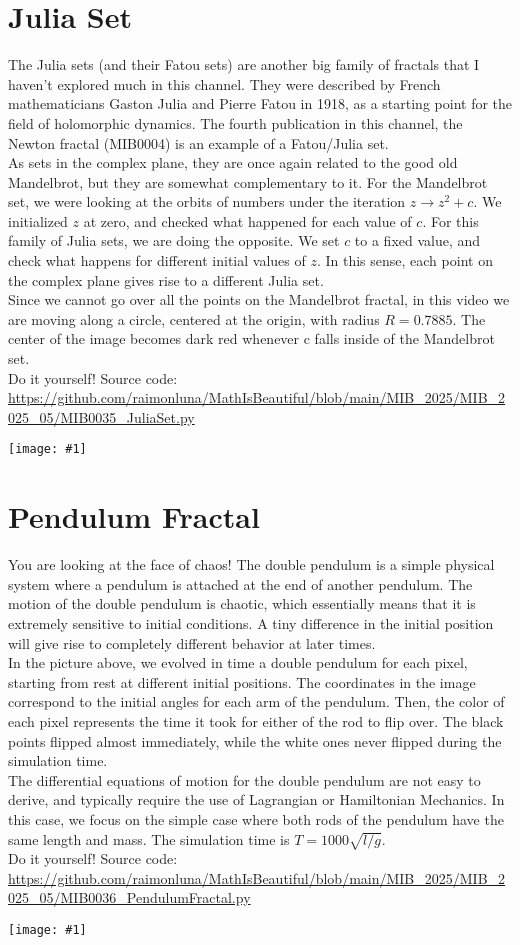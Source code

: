 \documentclass[12pt,landscape]{article}
\newcommand{\artpage}[3][]{%
  \begin{minipage}[t]{0.48\linewidth}
    \vspace{0pt} %
    \section*{#2} %
    \addcontentsline{toc}{section}{#2} %
    #3 %
  \end{minipage}%
  \hfill
  \begin{minipage}[t]{0.48\linewidth}
    \vspace{0pt} %
    \centering
    \texttt{[image: \#1]}
  \end{minipage}%
  \newpage
}
\begin{document}
\artpage[../Output/LowQuality/MIB0035_JuliaSet.png]{Julia Set}{%
The Julia sets (and their Fatou sets) are another big family of fractals that I haven't explored much in this channel. They were described by French mathematicians Gaston Julia and Pierre Fatou in 1918, as a starting point for the field of holomorphic dynamics. The fourth publication in this channel, the Newton fractal (MIB0004) is an example of a Fatou/Julia set.\\

As sets in the complex plane, they are once again related to the good old Mandelbrot, but they are somewhat complementary to it. For the Mandelbrot set, we were looking at the orbits of numbers under the iteration $z \to z^2 + c$. We initialized $z$ at zero, and checked what happened for each value of $c$. For this family of Julia sets, we are doing the opposite. We set $c$ to a fixed value, and check what happens for different initial values of $z$. In this sense, each point on the complex plane gives rise to a different Julia set.\\

Since we cannot go over all the points on the Mandelbrot fractal, in this video we are moving along a circle, centered at the origin, with radius $R = 0.7885$. The center of the image becomes dark red whenever c falls inside of the Mandelbrot set.\\

Do it yourself! Source code: \url{https://github.com/raimonluna/MathIsBeautiful/blob/main/MIB_2025/MIB_2025_05/MIB0035_JuliaSet.py}
}

\artpage[../Output/LowQuality/MIB0036_PendulumFractal.png]{Pendulum Fractal}{%
You are looking at the face of chaos! The double pendulum is a simple physical system where a pendulum is attached at the end of another pendulum. The motion of the double pendulum is chaotic, which essentially means that it is extremely sensitive to initial conditions. A tiny difference in the initial position will give rise to completely different behavior at later times.\\

In the picture above, we evolved in time a double pendulum for each pixel, starting from rest at different initial positions. The coordinates in the image correspond to the initial angles for each arm of the pendulum. Then, the color of each pixel represents the time it took for either of the rod to flip over. The black points flipped almost immediately, while the white ones never flipped during the simulation time. \\

The differential equations of motion for the double pendulum are not easy to derive, and typically require the use of Lagrangian or Hamiltonian Mechanics. In this case, we focus on the simple case where both rods of the pendulum have the same length and mass. The simulation time is $T = 1000 \sqrt{l / g}$.\\

Do it yourself! Source code: \url{https://github.com/raimonluna/MathIsBeautiful/blob/main/MIB_2025/MIB_2025_05/MIB0036_PendulumFractal.py}
}
\end{document}
